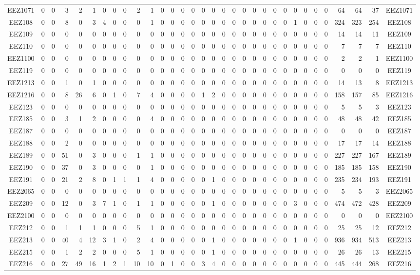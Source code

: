 \documentclass[10pt,a4paper,twoside]{report}
\begin{document}
{\begin{tabular}{crrrrrrrrrrrrrrrrrrrrrrrrrrrrrrc}
EEZ1071&0&0&3&2&1&0&0&0&2&1&0&0&0&0&0&0&0&0&0&0&0&0&0&0&0&0&0&64&64&37&EEZ1071\\
EEZ108&0&0&8&0&3&4&0&0&0&1&0&0&0&0&0&0&0&0&0&0&0&0&0&1&0&0&0&324&323&254&EEZ108\\
EEZ109&0&0&0&0&0&0&0&0&0&0&0&0&0&0&0&0&0&0&0&0&0&0&0&0&0&0&0&14&14&11&EEZ109\\
EEZ110&0&0&0&0&0&0&0&0&0&0&0&0&0&0&0&0&0&0&0&0&0&0&0&0&0&0&0&7&7&7&EEZ110\\
EEZ1100&0&0&0&0&0&0&0&0&0&0&0&0&0&0&0&0&0&0&0&0&0&0&0&0&0&0&0&2&2&1&EEZ1100\\
EEZ119&0&0&0&0&0&0&0&0&0&0&0&0&0&0&0&0&0&0&0&0&0&0&0&0&0&0&0&0&0&0&EEZ119\\
EEZ1213&0&0&1&0&1&0&0&0&0&0&0&0&0&0&0&0&0&0&0&0&0&0&0&0&0&0&0&14&13&8&EEZ1213\\
EEZ1216&0&0&8&26&6&0&1&0&7&4&0&0&0&0&1&2&0&0&0&0&0&0&0&0&0&0&0&158&157&85&EEZ1216\\
EEZ123&0&0&0&0&0&0&0&0&0&0&0&0&0&0&0&0&0&0&0&0&0&0&0&0&0&0&0&5&5&3&EEZ123\\
EEZ185&0&0&3&1&2&0&0&0&0&4&0&0&0&0&0&0&0&0&0&0&0&0&0&0&0&0&0&48&48&42&EEZ185\\
EEZ187&0&0&0&0&0&0&0&0&0&0&0&0&0&0&0&0&0&0&0&0&0&0&0&0&0&0&0&0&0&0&EEZ187\\
EEZ188&0&0&2&0&0&0&0&0&0&0&0&0&0&0&0&0&0&0&0&0&0&0&0&0&0&0&0&17&17&14&EEZ188\\
EEZ189&0&0&51&0&3&0&0&0&1&1&0&0&0&0&0&0&0&0&0&0&0&0&0&0&0&0&0&227&227&167&EEZ189\\
EEZ190&0&0&37&0&3&0&0&0&0&1&0&0&0&0&0&0&0&0&0&0&0&0&0&0&0&0&0&185&185&158&EEZ190\\
EEZ191&0&0&21&2&8&0&1&1&1&4&0&0&0&0&0&1&0&0&0&0&0&0&0&0&0&0&0&235&234&193&EEZ191\\
EEZ2065&0&0&0&0&0&0&0&0&0&0&0&0&0&0&0&0&0&0&0&0&0&0&0&0&0&0&0&5&5&3&EEZ2065\\
EEZ209&0&0&12&0&3&7&1&0&1&1&0&0&0&0&0&1&0&0&0&0&0&0&0&3&0&0&0&474&472&428&EEZ209\\
EEZ2100&0&0&0&0&0&0&0&0&0&0&0&0&0&0&0&0&0&0&0&0&0&0&0&0&0&0&0&0&0&0&EEZ2100\\
EEZ212&0&0&1&1&1&0&0&0&5&1&0&0&0&0&0&0&0&0&0&0&0&0&0&0&0&0&0&25&25&12&EEZ212\\
EEZ213&0&0&40&4&12&3&1&0&2&4&0&0&0&0&0&1&0&0&0&0&0&0&0&1&0&0&0&936&934&513&EEZ213\\
EEZ215&0&0&1&2&2&0&0&0&5&1&0&0&0&0&0&1&0&0&0&0&0&0&0&0&0&0&0&26&26&13&EEZ215\\
EEZ216&0&0&27&49&16&1&2&1&10&10&0&1&0&0&3&4&0&0&0&0&0&0&0&0&0&0&0&445&444&268&EEZ216\\

\end{tabular}}
\end{document}

